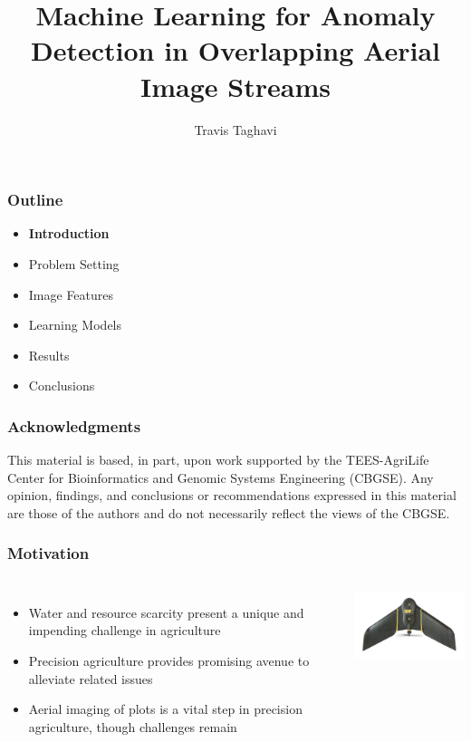 \documentclass{beamer}
\title{Machine Learning for Anomaly Detection in Overlapping Aerial Image Streams}
\author{Travis Taghavi}
\institute{Electrical and Computer Engineering \\ Texas A\&M University}
\begin{document}
\begin{frame}
  \titlepage
\end{frame}


\begin{frame}
\frametitle{Outline}
\begin{itemize}
  \item \textbf{Introduction}
  \item\vspace{0.5cm} Problem Setting
  \item\vspace{0.5cm} Image Features
  \item \vspace{0.5cm}Learning Models
  \item \vspace{0.5cm} Results
  \item \vspace{0.5cm}Conclusions
\end{itemize}
\end{frame}


\begin{frame}
\frametitle{Acknowledgments}
This material is based, in part, upon work supported by the TEES-AgriLife Center for Bioinformatics and Genomic Systems Engineering (CBGSE). Any opinion, findings, and conclusions or recommendations expressed in this material are those of the authors and do not necessarily reflect the views of the CBGSE.
\end{frame}


\begin{frame}
\frametitle{Motivation}
\begin{columns}
    \begin{itemize}
      \item Water and resource scarcity present a unique and impending challenge in agriculture
      \item Precision agriculture provides promising avenue to alleviate related issues
      \item Aerial imaging of plots is a vital step in precision agriculture, though challenges remain
    \end{itemize}
  \includegraphics[width = 5cm]{Figures/ebee}
\end{columns}
\end{frame}
\end{document}
